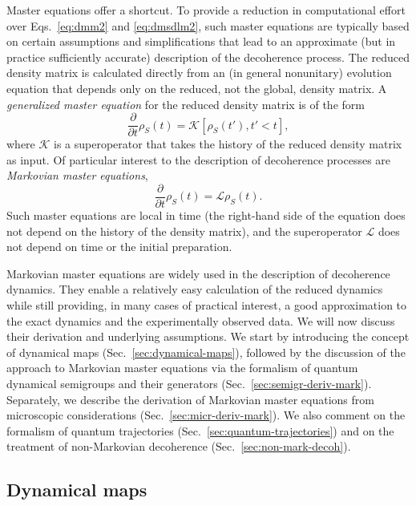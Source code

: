 \documentclass[3p,sort&compress]{elsarticle}
\newcommand{\op}[1]{#1}
\begin{document}
Master equations offer a shortcut. To provide a reduction in computational effort over Eqs.~\eqref{eq:dmm2} and \eqref{eq:dmsdlm2}, such master equations are typically based on certain assumptions and simplifications that lead to an approximate (but in practice sufficiently accurate) description of the decoherence process. The reduced density matrix is calculated directly from an (in general nonunitary) evolution equation that depends only on the reduced, not the global, density matrix. A \emph{generalized master equation} for the reduced density matrix is of the form 
%
\begin{equation}
\label{eq:dggamsdlm2}
  \frac{\partial}{\partial t} \op{\rho}_S(t) = \mathcal{K} \left[ \op{\rho}_S(t'), t' < t \right ],
\end{equation}
%
where $\mathcal{K}$ is a superoperator that takes the history of the reduced density matrix as input. Of particular interest to the description of decoherence processes are \emph{Markovian master equations}, 
%
\begin{equation}
\label{eq:dggamsdlm58672}
  \frac{\partial}{\partial t} \op{\rho}_S(t) = \mathcal{L}\op{\rho}_S(t).
\end{equation}
%
Such master equations are local in time (the right-hand side of the equation does not depend on the history of the density matrix), and the superoperator $\mathcal{L}$ does not depend on time or the initial preparation. 

Markovian master equations are widely used in the description of decoherence dynamics. They enable a relatively easy calculation of the reduced dynamics while still providing, in many cases of practical interest, a good approximation to the exact dynamics and the experimentally observed data. We will now discuss their derivation and underlying assumptions. We start by introducing the concept of dynamical maps (Sec.~\ref{sec:dynamical-maps}), followed by the discussion of the approach to Markovian master equations via the formalism of quantum dynamical semigroups and their generators (Sec.~\ref{sec:semigr-deriv-mark}). Separately, we describe the derivation of Markovian master equations from microscopic considerations (Sec.~\ref{sec:micr-deriv-mark}). We also comment on the formalism of quantum trajectories (Sec.~\ref{sec:quantum-trajectories}) and on the treatment of non-Markovian decoherence (Sec.~\ref{sec:non-mark-decoh}).

\subsection{\label{sec:dynamical-maps}Dynamical maps} 
\end{document}
